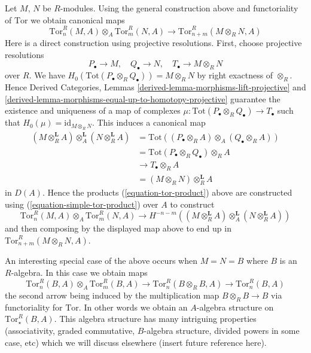 \medskip\noindent
Let $M$, $N$ be $R$-modules. Using the general construction above and
functoriality of $\text{Tor}$ we obtain canonical maps
\begin{equation}
\label{equation-tor-product}
\text{Tor}^R_n(M, A) \otimes_A \text{Tor}^R_m(N, A)
\longrightarrow \text{Tor}_{n + m}^R(M \otimes_R N, A)
\end{equation}
Here is a direct construction using projective resolutions. First, choose
projective resolutions
$$
P_\bullet \to M,\quad Q_\bullet \to N,\quad T_\bullet \to M \otimes_R N
$$
over $R$. We have
$H_0(\text{Tot}(P_\bullet \otimes_R Q_\bullet)) = M \otimes_R N$ by
right exactness of $\otimes_R$. Hence
Derived Categories, Lemmas \ref{derived-lemma-morphisms-lift-projective} and
\ref{derived-lemma-morphisms-equal-up-to-homotopy-projective}
guarantee the existence and uniqueness of a map of complexes
$\mu : \text{Tot}(P_\bullet \otimes_R Q_\bullet) \to T_\bullet$ such that
$H_0(\mu) = \text{id}_{M \otimes_R N}$. This induces a canonical map
\begin{align*}
(M \otimes_R^{\mathbf{L}} A) \otimes_A^{\mathbf{L}}
(N \otimes_R^{\mathbf{L}} A)
& =
\text{Tot}((P_\bullet \otimes_R A) \otimes_A (Q_\bullet \otimes_R A)) \\
& =
\text{Tot}(P_\bullet \otimes_R Q_\bullet) \otimes_R A \\
& \to
T_\bullet \otimes_R A \\
& = (M \otimes_R N) \otimes_R^{\mathbf{L}} A
\end{align*}
in $D(A)$. Hence the products (\ref{equation-tor-product}) above are
constructed using (\ref{equation-simple-tor-product}) over $A$ to construct
$$
\text{Tor}^R_n(M, A) \otimes_A \text{Tor}^R_m(N, A) \to
H^{-n-m}((M \otimes_R^{\mathbf{L}} A) \otimes_A^{\mathbf{L}}
(N \otimes_R^{\mathbf{L}} A))
$$
and then composing by the displayed map above to end up in
$\text{Tor}_{n + m}^R(M \otimes_R N, A)$.

\medskip\noindent
An interesting special case of the above occurs when $M = N = B$
where $B$ is an $R$-algebra. In this case we obtain maps
$$
\text{Tor}_n^R(B, A) \otimes_A \text{Tor}_m^R(B, A)
\longrightarrow
\text{Tor}_n^R(B \otimes_R B, A)
\longrightarrow
\text{Tor}_n^R(B, A)
$$
the second arrow being induced by the multiplication map
$B \otimes_R B \to B$ via functoriality for $\text{Tor}$.
In other words we obtain an $A$-algebra structure on
$\text{Tor}^R_{\star}(B, A)$. This algebra structure has many intriguing 
properties (associativity, graded commutative, $B$-algebra structure,
divided powers in some case, etc) which we will discuss elsewhere (insert
future reference here).

